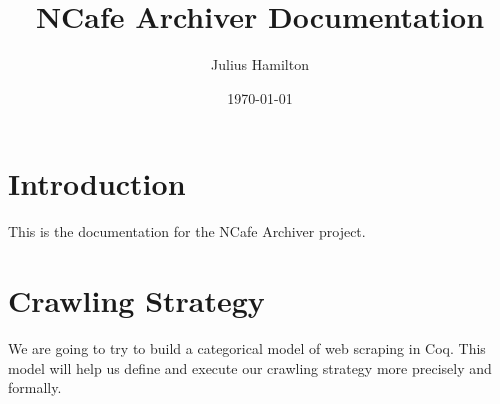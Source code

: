 \documentclass{article}
\title{NCafe Archiver Documentation}
\author{Julius Hamilton}
\date{\today}
\begin{document}
\maketitle
\section{Introduction}
This is the documentation for the NCafe Archiver project.

\section{Crawling Strategy}
We are going to try to build a categorical model of web scraping in Coq. This model will help us define and execute our crawling strategy more precisely and formally.
\end{document}
